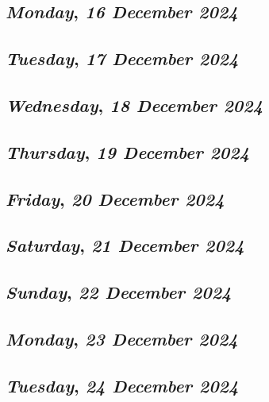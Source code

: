 \def\day{\textit{16 December 2024}}
\def\weekday{\textit{Monday}}
\subsection*{\weekday, \day}

\def\day{\textit{17 December 2024}}
\def\weekday{\textit{Tuesday}}
\subsection*{\weekday, \day}

\def\day{\textit{18 December 2024}}
\def\weekday{\textit{Wednesday}}
\subsection*{\weekday, \day}

\def\day{\textit{19 December 2024}}
\def\weekday{\textit{Thursday}}
\subsection*{\weekday, \day}

\def\day{\textit{20 December 2024}}
\def\weekday{\textit{Friday}}
\subsection*{\weekday, \day}

\def\day{\textit{21 December 2024}}
\def\weekday{\textit{Saturday}}
\subsection*{\weekday, \day}

\def\day{\textit{22 December 2024}}
\def\weekday{\textit{Sunday}}
\subsection*{\weekday, \day}

\def\day{\textit{23 December 2024}}
\def\weekday{\textit{Monday}}
\subsection*{\weekday, \day}

\def\day{\textit{24 December 2024}}
\def\weekday{\textit{Tuesday}}
\subsection*{\weekday, \day}

